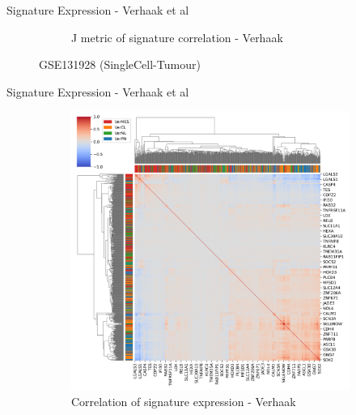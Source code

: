 \documentclass[aspectratio=169,9pt]{beamer}
\begin{document}
\begin{frame}{Signature Expression - Verhaak et al}
\begin{adjustwidth}{-5cm}{-5cm}
\begin{figure}
\begin{subfigure}[c]{0.4\textwidth}
                    \caption{J metric of signature correlation - Verhaak}
                \end{subfigure}
            \caption{GSE131928 (SingleCell-Tumour)}
            \end{figure}
        \end{adjustwidth}
    \end{frame}

    \begin{frame}{Signature Expression - Verhaak et al}
        \begin{adjustwidth}{-5cm}{-5cm}
            \centering
            \begin{figure}\ContinuedFloat
                \centering
                \begin{subfigure}[c]{0.48\textwidth}
                    \centering
                    \includegraphics[width=\textwidth]{celllines_Corrplot_Ver}
                    \caption{Correlation of signature expression - Verhaak}
                \end{subfigure}
                \begin{subfigure}[c]{0.4\textwidth}
                    \centering

\end{subfigure}
\end{figure}
\end{adjustwidth}
\end{frame}
\end{document}
